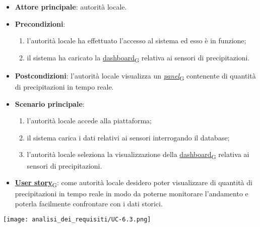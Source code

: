 \begin{itemize}
	\item \textbf{Attore principale}: autorità locale.
	\item \textbf{Precondizioni}:
	      \begin{enumerate}
		      \item l'autorità locale ha effettuato l'accesso al sistema ed esso è in funzione;
		      \item il sistema ha caricato la \href{https://7last.github.io/docs/pb/documentazione-interna/glossario\#dashboard}{dashboard\textsubscript{G}} relativa ai sensori di precipitazioni.
	      \end{enumerate}
	\item \textbf{Postcondizioni}: l'autorità locale visualizza un \href{https://7last.github.io/docs/pb/documentazione-interna/glossario\#panel}{\textit{panel}\textsubscript{G}} contenente di quantità di precipitazioni in tempo reale.
	\item \textbf{Scenario principale}:
	      \begin{enumerate}
		      \item l'autorità locale accede alla piattaforma;
		      \item il sistema carica i dati relativi ai sensori interrogando il database;
		      \item l'autorità locale seleziona la visualizzazione della \href{https://7last.github.io/docs/pb/documentazione-interna/glossario\#dashboard}{dashboard\textsubscript{G}} relativa ai sensori di precipitazioni.
	      \end{enumerate}
	\item \href{https://7last.github.io/docs/pb/documentazione-interna/glossario\#user-story}{\textbf{User story}\textsubscript{G}}:
	      come autorità locale desidero poter visualizzare di quantità di precipitazioni in tempo reale in modo da poterne monitorare l'andamento
	      e poterla facilmente confrontare con i dati storici.
\end{itemize}
\begin{center}
	\texttt{[image: analisi\_dei\_requisiti/UC-6.3.png]}
\end{center}


